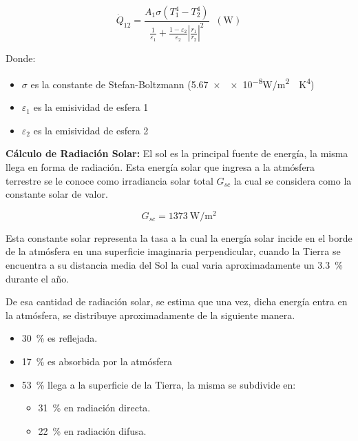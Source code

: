 \begin{equation}\label{radint}
    \dot{Q}_{12}=\frac{A_{1}\sigma (T_{1}^{4}-T_{2}^{4})}{\frac{1}{\varepsilon _{1}}+\frac{1-\varepsilon _{2}}{\varepsilon _{2}}\left | \frac{r_{1}}{r_{2}} \right |^{2}}\;\;(\si{\watt})
\end{equation}

Donde:

\begin{itemize}
    \item $\sigma$ es la constante de Stefan-Boltzmann (\num{5,67xe-8}\si{\watt/\square\meter\cdot\kelvin\tothe{4}})
    \item $\varepsilon _{1}$ es la emisividad de esfera 1
    \item $\varepsilon _{2}$ es la emisividad de esfera 2
\end{itemize}

\textbf{Cálculo de Radiación Solar:} El sol es la principal fuente de energía, la misma llega en forma de radiación. Esta energía solar que ingresa a la atmósfera terrestre se le conoce como irradiancia solar total $G_{sc}$ la cual se considera como la constante solar de valor. \cite{cengel}

\begin{equation}\label{gsc}
    G_{sc}=\SI{1373}{\watt/\square\meter}
\end{equation}

Esta constante solar representa la tasa a la cual la energía solar incide en el borde de la atmósfera en una superficie imaginaria perpendicular, cuando la Tierra se encuentra a su distancia media del Sol la cual varia aproximadamente un \SI{3,3}{\percent} durante el año. \cite{cengel}

De esa cantidad de radiación solar, se estima que una vez, dicha energía entra en la atmósfera, se distribuye aproximadamente de la siguiente manera. \cite{solar}

\begin{itemize}
    \item \SI{30}{\percent} es reflejada.
    \item \SI{17}{\percent} es absorbida por la atmósfera
    \item \SI{53}{\percent} llega a la superficie de la Tierra, la misma se subdivide en:
    \begin{itemize}
        \item \SI{31}{\percent} en radiación directa.
        \item \SI{22}{\percent} en radiación difusa.
    \end{itemize}
\end{itemize}

